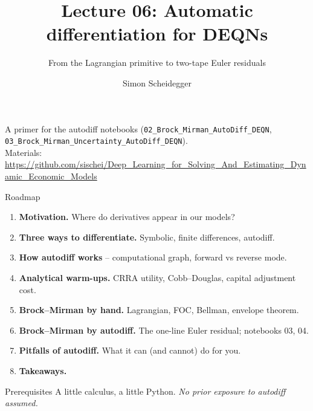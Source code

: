 \documentclass[aspectratio=169,11pt]{beamer}
\title[Lecture 06]{Lecture 06: Automatic differentiation for DEQNs}
\subtitle{From the Lagrangian primitive to two-tape Euler residuals}
\author{Simon Scheidegger}
\institute[HEC Lausanne]{HEC, University of Lausanne}
\date{}
\begin{document}

{
\begin{frame}
\titlepage
\vspace{-0.4cm}
\begin{center}
{\footnotesize A primer for the autodiff notebooks (\texttt{02\_Brock\_Mirman\_AutoDiff\_DEQN}, \texttt{03\_Brock\_Mirman\_Uncertainty\_AutoDiff\_DEQN}).}\\[4pt]
{\footnotesize Materials: \url{https://github.com/sischei/Deep_Learning_for_Solving_And_Estimating_Dynamic_Economic_Models}}
\end{center}
\end{frame}
}

\begin{frame}{Roadmap}
\begin{enumerate}\itemsep4pt
  \item \textbf{Motivation.} Where do derivatives appear in our models?
  \item \textbf{Three ways to differentiate.} Symbolic, finite differences, autodiff.
  \item \textbf{How autodiff works} -- computational graph, forward vs reverse mode.
  \item \textbf{Analytical warm-ups.} CRRA utility, Cobb--Douglas, capital adjustment cost.
  \item \textbf{Brock--Mirman by hand.} Lagrangian, FOC, Bellman, envelope theorem.
  \item \textbf{Brock--Mirman by autodiff.} The one-line Euler residual; notebooks 03, 04.
  \item \textbf{Pitfalls of autodiff.} What it can (and cannot) do for you.
  \item \textbf{Takeaways.}
\end{enumerate}
\vspace{6pt}
\begin{block}{Prerequisites}
\small
A little calculus, a little Python. \emph{No prior exposure to autodiff assumed.}
\end{block}
\end{frame}
\end{document}
